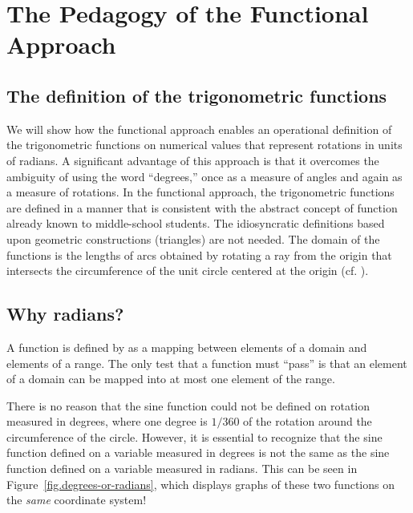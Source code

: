 
\chapter{The Pedagogy of the Functional Approach}

\section{The definition of the trigonometric functions}

We will show how the functional approach enables an operational definition of the  trigonometric functions on numerical values that represent rotations in units of radians.
A significant advantage of this approach is that it overcomes the ambiguity of using the word ``degrees,'' once as a measure of angles and again as a measure of rotations.
In the functional approach, the trigonometric functions are defined in a manner that is consistent with the abstract concept of function already known to middle-school students. The idiosyncratic definitions based upon geometric constructions (triangles) are not needed. The domain of the functions is the lengths of arcs obtained by rotating a ray from the origin that intersects the circumference of the unit circle centered at the origin (cf. \cite{moore}).

\section{Why radians?}

A function is defined by as a mapping between elements of a domain and elements of a range. The only test that a function must ``pass'' is that an element of a domain can be mapped into at most one element of the range.

There is no reason that the sine function could not be defined on rotation measured in degrees, where one degree is $1/360$ of the rotation around the circumference of the circle. However, it is essential to recognize that the sine function defined on a variable measured in degrees is not the same as the sine function defined on a variable measured in radians. This can be seen in 
Figure~\ref{fig.degrees-or-radians}, which displays graphs of these two functions on the \emph{same} coordinate system!

